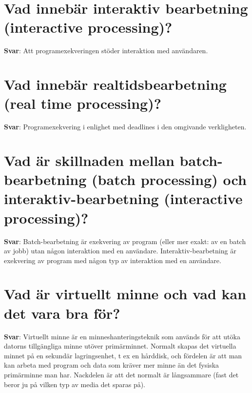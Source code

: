 \documentclass[a4paper,11pt,oneside]{book}
\begin{document}
\begin{sloppypar}
\section{Vad inneb\"ar interaktiv bearbetning (interactive processing)?}

\label{q:110:sa:sv:True}

\textbf{Svar}: Att programexekveringen st\"oder interaktion med anv\"andaren.



\section{Vad inneb\"ar realtidsbearbetning (real time processing)?}

\label{q:111:sa:sv:True}

\textbf{Svar}: Programexekvering i enlighet med deadlines i den omgivande verkligheten.



\section{Vad \"ar skillnaden mellan batch-bearbetning (batch processing) och interaktiv-bearbetning (interactive processing)?}

\label{q:112:sa:sv:True}

\textbf{Svar}: Batch-bearbetning \"ar exekvering av program (eller mer exakt: av en batch av jobb) utan n\r{a}gon interaktion med en anv\"andare. Interaktiv-bearbetning \"ar exekvering av program med n\r{a}gon typ av interaktion med en anv\"andare.



\section{Vad \"ar virtuellt minne och vad kan det vara bra f\"or?}

\label{q:113:sa:sv:True}

\textbf{Svar}: Virtuellt minne \"ar en minneshanteringsteknik som anv\"ands f\"or att ut\"oka datorns tillg\"angliga minne ut\"over prim\"arminnet. Normalt skapas det virtuella minnet p\r{a} en sekund\"ar lagringsenhet, t ex en h\r{a}rddisk, och f\"ordelen \"ar att man kan arbeta med program och data som kr\"aver mer minne \"an det fysiska prim\"arminne man har. Nackdelen \"ar att det normalt \"ar l\r{a}ngsammare (fast det beror ju p\r{a} vilken typ av media det sparas p\r{a}).




\end{sloppypar}
\end{document}
